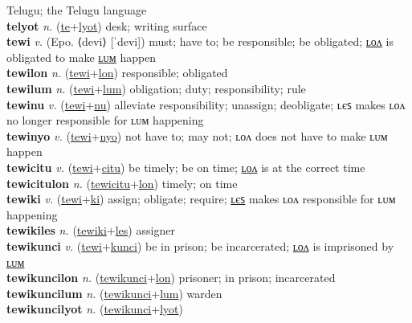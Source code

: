 Telugu; the Telugu language \label{'telukutilip} \\
\textbf{telyot} \textit{n.} (\hyperref[te]{te}+\hyperref[lyot]{lyot})
desk; writing surface \label{telyot} \\
\textbf{tewi} \textit{v.} (Epo. ⟨devi⟩ [ˈdevi])
must; have to; be responsible; be obligated; \hyperref[tewilon]{ʟᴏᴧ} is obligated to make \hyperref[tewilum]{ʟᴜᴍ} happen \label{tewi} \\
\textbf{tewilon} \textit{n.} (\hyperref[tewi]{tewi}+\hyperref[lon]{lon})
responsible; obligated \label{tewilon} \\
\textbf{tewilum} \textit{n.} (\hyperref[tewi]{tewi}+\hyperref[lum]{lum})
obligation; duty; responsibility; rule \label{tewilum} \\
\textbf{tewinu} \textit{v.} (\hyperref[tewi]{tewi}+\hyperref[nu]{nu})
alleviate responsibility; unassign; deobligate; ʟєꜱ makes ʟᴏᴧ no longer responsible for ʟᴜᴍ happening \label{tewinu} \\
\textbf{tewinyo} \textit{v.} (\hyperref[tewi]{tewi}+\hyperref[nyo]{nyo})
not have to; may not; ʟᴏᴧ does not have to make ʟᴜᴍ happen \label{tewinyo} \\
\textbf{tewicitu} \textit{v.} (\hyperref[tewi]{tewi}+\hyperref[citu]{citu})
be timely; be on time; \hyperref[tewicitulon]{ʟᴏᴧ} is at the correct time \label{tewicitu} \\
\textbf{tewicitulon} \textit{n.} (\hyperref[tewicitu]{tewicitu}+\hyperref[lon]{lon})
timely; on time \label{tewicitulon} \\
\textbf{tewiki} \textit{v.} (\hyperref[tewi]{tewi}+\hyperref[ki]{ki})
assign; obligate; require; \hyperref[tewikiles]{ʟєꜱ} makes ʟᴏᴧ responsible for ʟᴜᴍ happening \label{tewiki} \\
\textbf{tewikiles} \textit{n.} (\hyperref[tewiki]{tewiki}+\hyperref[les]{les})
assigner \label{tewikiles} \\
\textbf{tewikunci} \textit{v.} (\hyperref[tewi]{tewi}+\hyperref[kunci]{kunci})
be in prison; be incarcerated; \hyperref[tewikuncilon]{ʟᴏᴧ} is imprisoned by \hyperref[tewikuncilum]{ʟᴜᴍ} \label{tewikunci} \\
\textbf{tewikuncilon} \textit{n.} (\hyperref[tewikunci]{tewikunci}+\hyperref[lon]{lon})
prisoner; in prison; incarcerated \label{tewikuncilon} \\
\textbf{tewikuncilum} \textit{n.} (\hyperref[tewikunci]{tewikunci}+\hyperref[lum]{lum})
warden \label{tewikuncilum} \\
\textbf{tewikuncilyot} \textit{n.} (\hyperref[tewikunci]{tewikunci}+\hyperref[lyot]{lyot})
